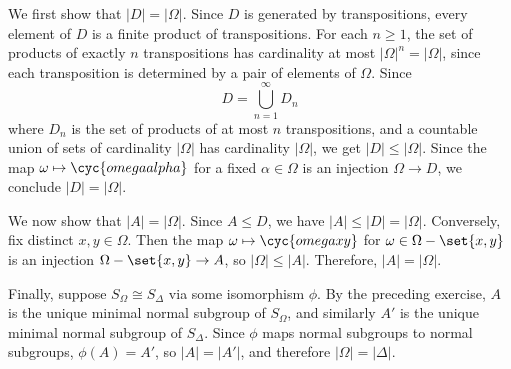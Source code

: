 \begin{sol}
	We first show that $|D| = |\Omega|$.
	Since $D$ is generated by transpositions, every element of $D$ is a finite product of transpositions.
	For each $n \geq 1$, the set of products of exactly $n$ transpositions has cardinality at most $|\Omega|^n = |\Omega|$, since each transposition is determined by a pair of elements of $\Omega$.
	Since
	\[
		D = \bigcup_{n=1}^\infty D_n
	\]
	where $D_n$ is the set of products of at most $n$ transpositions, and a countable union of sets of cardinality $|\Omega|$ has cardinality $|\Omega|$, we get $|D| \leq |\Omega|$.
	Since the map $\omega \mapsto \cyc{omega alpha}$ for a fixed $\alpha \in \Omega$ is an injection $\Omega \to D$, we conclude $|D| = |\Omega|$.

    We now show that $|A| = |\Omega|$.
	Since $A \leq D$, we have $|A| \leq |D| = |\Omega|$.
	Conversely, fix distinct $x, y \in \Omega$.
	Then the map $\omega \mapsto \cyc{omega x y}$ for $\omega \in \Omega - \set{x, y}$ is an injection $\Omega - \set{x, y} \to A$, so $|\Omega| \leq |A|$.
	Therefore, $|A| = |\Omega|$.

    Finally, suppose $S_\Omega \cong S_\Delta$ via some isomorphism $\phi$.
	By the preceding exercise, $A$ is the unique minimal normal subgroup of $S_\Omega$, and similarly $A'$ is the unique minimal normal subgroup of $S_\Delta$.
	Since $\phi$ maps normal subgroups to normal subgroups, $\phi(A) = A'$, so $|A| = |A'|$, and therefore $|\Omega| = |\Delta|$.
\end{sol}